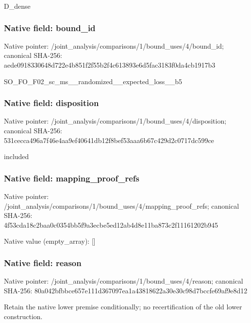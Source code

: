 \documentclass[10pt,a4paper]{article}
\begin{document}
\begingroup\raggedright\sloppy D\_\allowbreak{}dense\par\endgroup

\subsubsection{Native field: bound\_\allowbreak{}id}
Native pointer: /joint\_\allowbreak{}analysis/comparisons/1/bound\_\allowbreak{}uses/4/bound\_\allowbreak{}id; canonical SHA-256: aede0918330648d722e4b851f2f55b2f4c613893e6d5fac3183f0da4cb1917b3

\begingroup\raggedright\sloppy SO\_\allowbreak{}FO\_\allowbreak{}F02\_\allowbreak{}sc\_\allowbreak{}ms\_\allowbreak{}\_\allowbreak{}randomized\_\allowbreak{}\_\allowbreak{}expected\_\allowbreak{}loss\_\allowbreak{}\_\allowbreak{}b5\par\endgroup

\subsubsection{Native field: disposition}
Native pointer: /joint\_\allowbreak{}analysis/comparisons/1/bound\_\allowbreak{}uses/4/disposition; canonical SHA-256: 531cecca496a7f46e4aa9ef40641db12f8bef53aaa6b67c429d2c0717dc599ce

\begingroup\raggedright\sloppy included\par\endgroup

\subsubsection{Native field: mapping\_\allowbreak{}proof\_\allowbreak{}refs}
Native pointer: /joint\_\allowbreak{}analysis/comparisons/1/bound\_\allowbreak{}uses/4/mapping\_\allowbreak{}proof\_\allowbreak{}refs; canonical SHA-256: 4f53cda18c2baa0c0354bb5f9a3ecbe5ed12ab4d8e11ba873c2f11161202b945

Native value (empty\_\allowbreak{}array): []

\subsubsection{Native field: reason}
Native pointer: /joint\_\allowbreak{}analysis/comparisons/1/bound\_\allowbreak{}uses/4/reason; canonical SHA-256: 80a042bfbbce657e111d367097ea1a43818622a30e30c98d7bccfe69af9e8d12

\begingroup\raggedright\sloppy Retain the native lower premise conditionally;\allowbreak{} no recertification of the old lower construction.\par\endgroup
\end{document}
